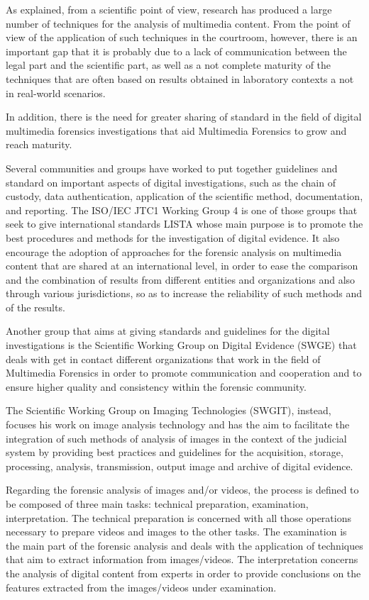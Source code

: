 As explained, from a scientific point of view, research has produced a large number of techniques for the analysis of multimedia content. From the point of view of the application of such techniques in the courtroom, however, there is an important gap that it is probably due to a lack of communication between the legal part and the scientific part, as well as a not complete maturity of the techniques that are often based on results obtained in laboratory contexts a not in real-world scenarios.

In addition, there is the need for greater sharing of standard in the field of digital multimedia forensics investigations that aid Multimedia Forensics to grow and reach maturity.

Several communities and groups have worked to put together guidelines and standard on important aspects of digital investigations, such as the chain of custody, data authentication, application of the scientific method, documentation, and reporting.
The ISO/IEC JTC1 Working Group 4 is one of those groups that seek to give international standards {LISTA} whose main purpose is to promote the best procedures and methods for the investigation of digital evidence. It also encourage the adoption of approaches for the forensic analysis on multimedia content that are shared at an international level, in order to ease the comparison and the combination of results from different entities and organizations and also through various jurisdictions, so as to increase the reliability of such methods and of the results.

Another group that aims at giving standards and guidelines for the digital investigations is the Scientific Working Group on Digital Evidence (SWGE) that deals with get in contact different organizations that work in the field of Multimedia Forensics in order to promote communication and cooperation and to ensure higher quality and consistency within the forensic community.

The Scientific Working Group on Imaging Technologies (SWGIT), instead, focuses his work on image analysis technology and has the aim to facilitate the integration of such methods of analysis of images in the context of the judicial system by providing best practices and guidelines for the acquisition, storage, processing, analysis, transmission, output image and archive of digital evidence.

Regarding the forensic analysis of images and/or videos, the process is defined to be composed of three main tasks: technical preparation, examination, interpretation. The technical preparation is concerned with all those operations necessary to prepare videos and images to the other tasks. The examination is the main part of the forensic analysis and deals with the application of techniques that aim to extract information from images/videos. The interpretation concerns the analysis of digital content from experts in order to provide conclusions on the features extracted from the images/videos under examination.

